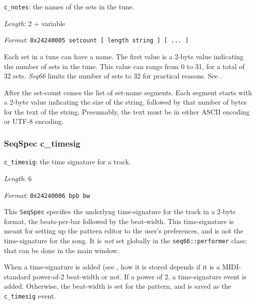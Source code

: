 
   \begin{description}
      \item \texttt{c\_notes}: the names of the sets in the tune.
      \item \textsl{Length}: 2 + variable
      \item \textsl{Format}: \texttt{0x24240005 setcount [ length string ] [ ... ] }
   \end{description}

   Each set in a tune can have a name.  The first value is a 2-byte value
   indicating the number of sets in the tune.  This value can range from
   0 to 31, for a total of 32 sets.
   \textsl{Seq66} limits the number of sets to 32 for practical reasons.
   See .

   After the set-count comes the list of set-name segments.  Each segment
   starts with a 2-byte value indicating the size of the string, followed
   by that number of bytes for the text of the string.  Presumably, the
   text must be in either ASCII encoding or UTF-8 encoding.

\subsubsection{SeqSpec c\_timesig}
\label{subsubsec:midi_format_track_seqspec_timesig}


   \begin{description}
      \item \texttt{c\_timesig}: the time signature for a track.
      \item \textsl{Length}: 6
      \item \textsl{Format}: \texttt{0x24240006 bpb bw}
   \end{description}

   This \texttt{SeqSpec} specifies the underlyng
   time-signature for the track in a 2-byte
   format, the beats-per-bar followed by the beat-width.
   This time-signature is meant for setting up the pattern editor to the
   user's preferences, and is not the time-signature for the song.
   It is \textsl{not} set globally in the \texttt{seq66::performer} class;
   that can be done in the main window.

   When a time-signature is added
   (see ,
   how it is stored depends if it is a MIDI-standard power-of-2 beat-width or
   not.  If a power of 2, a time-signature event is added.
   Otherwise, the beat-width is set for the pattern, and is saved as the
   \texttt{c\_timesig} event.

